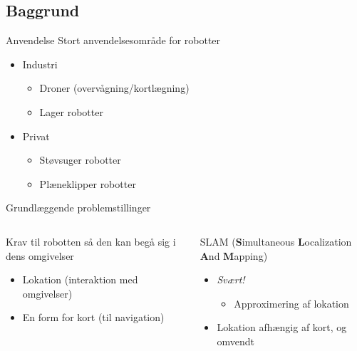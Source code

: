 \subsection{Baggrund}
\begin{frame}[fragile]{Anvendelse}
	Stort anvendelsesområde for robotter
	\begin{itemize}
		\item Industri
			\begin{itemize}
			\item Droner (overvågning/kortlægning)
			\item Lager robotter
			\end{itemize}
		\item Privat
			\begin{itemize}
			\item Støvsuger robotter
			\item Plæneklipper robotter
		\end{itemize}
	\end{itemize}
\end{frame}

\begin{frame}[fragile]{Grundlæggende problemstillinger}
	\begin{columns}
		\begin{column}{0.5\textwidth}
			Krav til robotten så den kan begå sig i dens omgivelser
			\linespace
			\begin{itemize}
				\item Lokation (interaktion med omgivelser)
				\item En form for kort (til navigation)
			\end{itemize}
		\end{column}
		\pause
		\begin{column}{0.5\textwidth}
			SLAM (\textbf{S}imultaneous \textbf{L}ocalization \textbf{A}nd \textbf{M}apping)
			\linespace
			\begin{itemize}
				\item \textit{Svært!}
					\begin{itemize}
						\item Approximering af lokation
					\end{itemize}
				\item Lokation afhængig af kort, og omvendt
			\end{itemize}
		\end{column}
\end{columns}
\end{frame}


